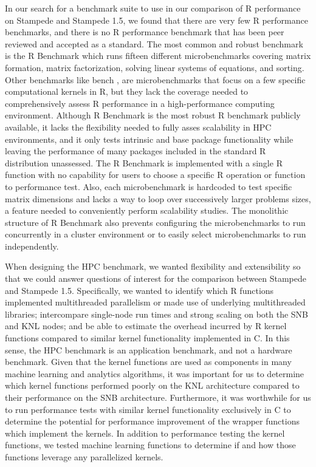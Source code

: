 In our search for a benchmark suite to use in our comparison of R performance on
Stampede and Stampede 1.5, we found that there are very few R performance benchmarks, and
there is no R performance benchmark that has been peer reviewed and accepted as a
standard. The most common and robust benchmark is the R Benchmark
\cite{urbanek:Rbenchmarks} which runs fifteen different microbenchmarks covering matrix
formation, matrix factorization, solving linear systems of equations, and sorting. Other
benchmarks like bench \cite{urbanek:Rbenchmarks}, are microbenchmarks that
focus on a few specific computational kernels in R, but they lack the coverage needed to
comprehensively assess R performance in a high-performance computing environment.
Although R Benchmark is the most robust R benchmark publicly available, it lacks the
flexibility needed to fully asses scalability in HPC environments, and it only tests
intrinsic and base package functionality while leaving the performance of many packages
included in the standard R distribution unassessed.  The R Benchmark is implemented with
a single R function with no capability for users to choose a specific R operation or
function to performance test.  Also, each microbenchmark is hardcoded to test specific
matrix dimensions and lacks a way to loop over successively larger problems sizes, a
feature needed to conveniently perform scalability studies.  The monolithic structure of
R Benchmark also prevents configuring the microbenchmarks to run concurrently in a cluster
environment or to easily select microbenchmarks to run independently.

When designing the HPC benchmark, we wanted flexibility and extensibility so that
we could answer questions of interest for the comparison between
Stampede and Stampede 1.5. Specifically, we wanted to identify which R functions 
implemented multithreaded parallelism or made use of underlying multithreaded
libraries; intercompare single-node run times and strong scaling on both the SNB
and KNL nodes; and be able to estimate the overhead incurred by R kernel
functions compared to similar kernel functionality implemented in C.  In this sense, the
HPC benchmark is an application benchmark, and not a hardware benchmark.  Given that the kernel
functions are used as components in many machine learning and analytics algorithms, it was
important for us to determine which kernel functions performed poorly on the KNL
architecture compared to their performance on the SNB architecture. Furthermore, it was
worthwhile for us to run performance tests with similar kernel functionality exclusively
in C to determine the potential for performance improvement of the wrapper functions which
implement the kernels. In addition to performance testing the kernel functions, we tested
machine learning functions to determine if and how those functions leverage any
parallelized kernels.

